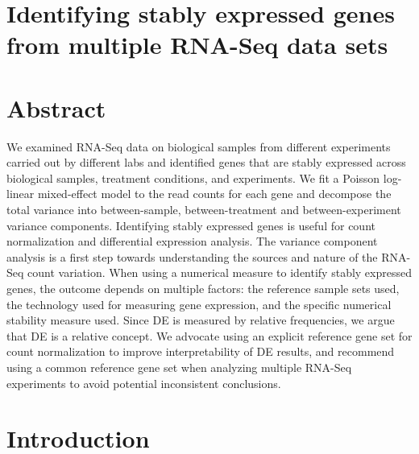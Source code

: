 \section{Identifying stably expressed genes from multiple RNA-Seq data sets}\label{chap1}



		
	\newpage
	\section*{Abstract}
	We examined RNA-Seq data on \howmanySamples biological samples from \howmanylab different
	experiments carried out by different labs and identified genes that are stably
	expressed across biological samples, treatment conditions, and experiments. We
	fit a Poisson log-linear mixed-effect model to the read counts for each gene
	and decompose the total variance into between-sample, between-treatment and
	between-experiment variance components. Identifying stably expressed genes is
	useful for count normalization and differential expression analysis. The
	variance component analysis is a first step towards understanding the sources
	and nature of the RNA-Seq count variation.
	When using a numerical measure to identify stably expressed genes, the outcome
	depends on multiple factors: the reference sample sets used, the technology
	used for measuring gene expression, and the specific numerical stability
	measure used.  Since DE is measured by relative frequencies, we argue that DE
	is a relative concept. We advocate using an explicit reference gene set for
	count normalization to improve interpretability of DE results, and recommend
	using a common reference gene set when analyzing multiple RNA-Seq experiments
	to avoid potential inconsistent conclusions.
	
	
	
	\section{Introduction}\label{section:Introduction}
	
